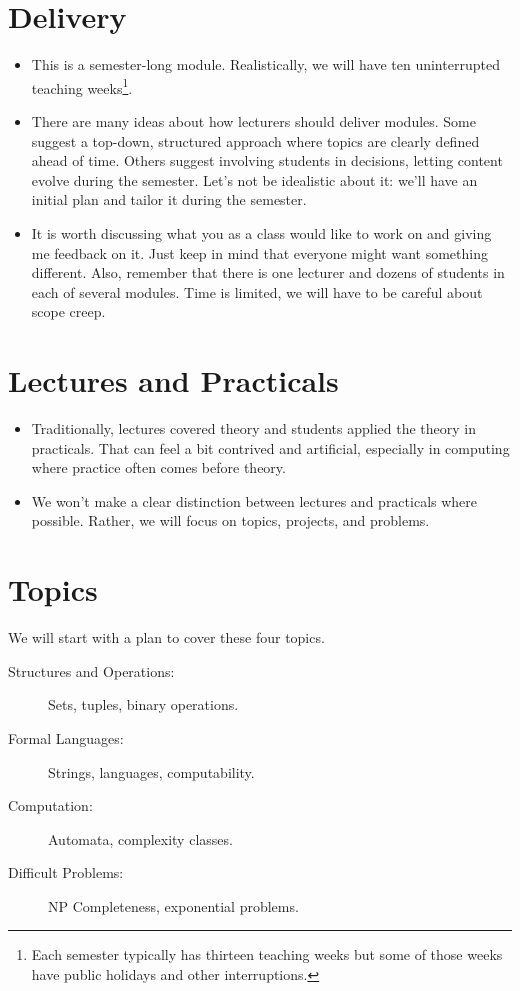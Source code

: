 \documentclass{iansnotes}
\begin{document}
\section{Delivery}
\begin{itemize}
  \item This is a semester-long module. Realistically, we will have ten uninterrupted teaching weeks\footnote{Each semester typically has thirteen teaching weeks but some of those weeks have public holidays and other interruptions.}.
  \item There are many ideas about how lecturers should deliver modules. Some suggest a top-down, structured approach where topics are clearly defined ahead of time. Others suggest involving students in decisions, letting content evolve during the semester. Let's not be idealistic about it: we'll have an initial plan and tailor it during the semester.
  \item It is worth discussing what you as a class would like to work on and giving me feedback on it. Just keep in mind that everyone might want something different. Also, remember that there is one lecturer and dozens of students in each of several modules. Time is limited, we will have to be careful about scope creep.
\end{itemize}

 
\section{Lectures and Practicals}
\begin{itemize}
  \item Traditionally, lectures covered theory and students applied the theory in practicals. That can feel a bit contrived and artificial, especially in computing where practice often comes before theory.
  \item We won't make a clear distinction between lectures and practicals where possible. Rather, we will focus on topics, projects, and problems.
\end{itemize}


\section{Topics}
We will start with a plan to cover these four topics.

\begin{description}
  \item[Structures and Operations:] Sets, tuples, binary operations.
  \item[Formal Languages:] Strings, languages, computability.
  \item[Computation:] Automata, complexity classes.
  \item[Difficult Problems:] NP Completeness, exponential problems.
\end{description}
\end{document}
